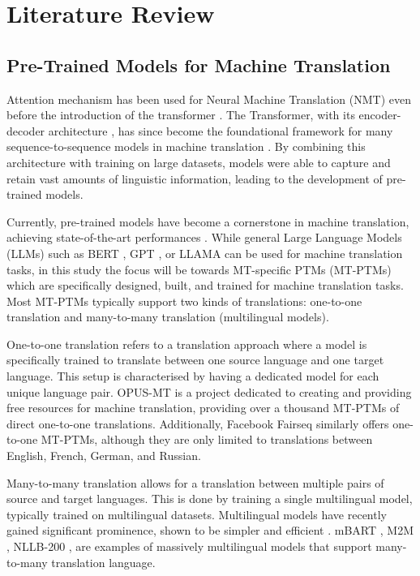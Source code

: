 \documentclass[a4paper, 11pt]{article}
\begin{document}
\section{Literature Review}

\subsection{Pre-Trained Models for Machine Translation}

Attention mechanism has been used for Neural Machine Translation (NMT) \cite{bahdanau-2016-nmt-jointly, luong-2015-effective-attention} even before the introduction of the transformer \cite{vaswani-2017-attention}. The Transformer, with its encoder-decoder architecture \cite{vaswani-2017-attention}, has since become the foundational framework for many sequence-to-sequence models in machine translation \cite{cho-2014-properties}. By combining this architecture with training on large datasets, models were able to capture and retain vast amounts of linguistic information, leading to the development of pre-trained models.

Currently, pre-trained models have become a cornerstone in machine translation, achieving state-of-the-art performances \cite{han-2021-ptms}. While general Large Language Models (LLMs) such as BERT \cite{devlin-2019-bert}, GPT \cite{openai-2024-gpt4}, or LLAMA \cite{touvron-2023-llama2} can be used for machine translation tasks, in this study the focus will be towards MT-specific PTMs (MT-PTMs) which are specifically designed, built, and trained for machine translation tasks. Most MT-PTMs typically support two kinds of translations: one-to-one translation and many-to-many translation (multilingual models).

One-to-one translation refers to a translation approach where a model is specifically trained to translate between one source language and one target language. This setup is characterised by having a dedicated model for each unique language pair. OPUS-MT \cite{tiedemann-2020-opus-mt} is a project dedicated to creating and providing free resources for machine translation, providing over a thousand MT-PTMs of direct one-to-one translations. Additionally, Facebook Fairseq \cite{ott-2019-fairseq} similarly offers one-to-one MT-PTMs, although they are only limited to translations between English, French, German, and Russian.

Many-to-many translation allows for a translation between multiple pairs of source and target languages. This is done by training a single multilingual model, typically trained on multilingual datasets. Multilingual models have recently gained significant prominence, shown to be simpler and efficient \cite{aharoni-2019-massively-multilingual}. mBART \cite{liu-2020-mbart}, M2M \cite{fan-2020-m2m100}, NLLB-200 \cite{nllb200-2020}, are examples of massively multilingual models that support many-to-many translation language.
\end{document}
